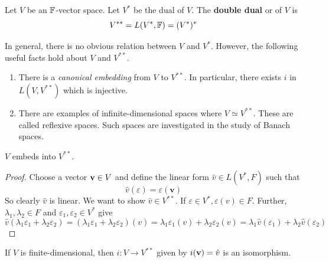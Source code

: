 \documentclass[a4paper]{article}
\begin{document}
\begin{definition}
	Let \( V \) be an \( {\mathbb{F}} \)-vector space.
	Let \( V^* \) be the dual of \( V \).
	The \textbf{double dual} or  of \( V \) is
	\[
		V^{* *} = L(V^*, {\mathbb{F}}) = (V^*)^*
	\]
\end{definition}
\begin{remark}
	In general, there is no obvious relation between \( V \) and \( V^* \).
	However, the following useful facts hold about \( V \) and \( V^{* *} \).
	\begin{enumerate}
		\item There is a \textit{canonical embedding} from \( V \) to \( V^{* *} \).
		      In particular, there exists \( i \) in \( L(V, V^{* *}) \) which is injective.
		\item There are examples of infinite-dimensional spaces where \( V \simeq V^{* *} \).
		      These are called reflexive spaces.
		      Such spaces are investigated in the study of Banach spaces.
	\end{enumerate}
\end{remark}
\begin{theorem}
	\( V \) embeds into \( V^{* *} \).
\end{theorem}
\begin{proof}
	Choose a vector \( {\bf v} \in V \) and define the linear form \( \hat v \in L(V^*, F) \) such that
	\[
		\hat v(\varepsilon) = \varepsilon(\mathbf{v})
	\]
	So clearly \( \hat v \) is linear.
	We want to show \( \hat v \in V^{* *} \).
	If \( \varepsilon \in V^*, \varepsilon(v) \in F \).
	Further, \( \lambda_1, \lambda_2 \in F \) and \( \varepsilon_1, \varepsilon_2 \in V^* \) give
	\[
		\hat v (\lambda_1 \varepsilon_1 + \lambda_2 \varepsilon_2) = (\lambda_1 \varepsilon_1 + \lambda_2 \varepsilon_2)(v) = \lambda_1 \varepsilon_1(v) + \lambda_2 \varepsilon_2(v) = \lambda_1 \hat v(\varepsilon_1) + \lambda_2 \hat v(\varepsilon_2)
	\]
\end{proof}
\begin{theorem}
	If \( V \) is finite-dimensional, then \( i \colon V \to V^{* *} \) given by \( i({\bf v}) = \hat v \) is an isomorphism.
\end{theorem}
\end{document}
